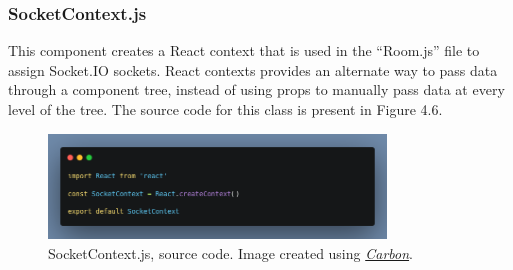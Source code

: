 \subsubsection{SocketContext.js}
This component creates a React context that is used in the “Room.js” file to assign Socket.IO sockets. React contexts provides an alternate way to pass data through a component tree, instead of using props to manually pass data at every level of the tree. The source code for this class is present in Figure 4.6.
\begin{figure}[H]
    \centering
    \includegraphics[width=0.8\textwidth]{img/SystemDesign/socketContextJs.png}
    \caption{SocketContext.js, source code. Image created using \href{https://carbon.now.sh/}{\textit{Carbon}}.}
\end{figure}

